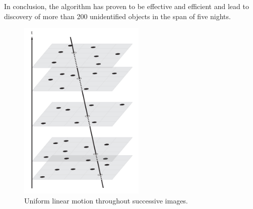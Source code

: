 	In conclusion, the algorithm has proven to be effective and efficient and lead to discovery of more than 200 unidentified objects in the span of five nights.

	\begin{figure}[H]
	\centering
	  \includegraphics[width=6cm]{images/uniform_linear_motion}
		  \caption{Uniform linear motion throughout successive images.}
	  \label{fig:u_l_m}
	\end{figure}